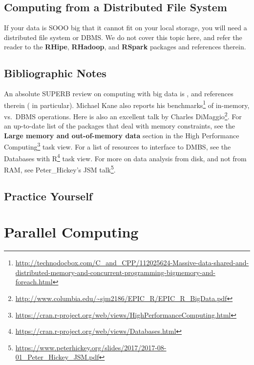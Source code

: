 \documentclass[]{book}
\renewcommand{\href}[2]{#2\footnote{\url{#1}}}
\theoremstyle{definition}
\theoremstyle{definition}
\theoremstyle{definition}
\theoremstyle{remark}
\begin{document}
\hypertarget{computing-from-a-distributed-file-system}{%
\section{Computing from a Distributed File System}\label{computing-from-a-distributed-file-system}}

If your data is SOOO big that it cannot fit on your local storage, you will need a distributed file system or DBMS.
We do not cover this topic here, and refer the reader to the \textbf{RHipe}, \textbf{RHadoop}, and \textbf{RSpark} packages and references therein.

\hypertarget{bibliographic-notes-13}{%
\section{Bibliographic Notes}\label{bibliographic-notes-13}}

An absolute SUPERB review on computing with big data is \citet{wang2015statistical}, and references therein (\citet{kane2013scalable} in particular).
Michael Kane also reports \href{http://technodocbox.com/C_and_CPP/112025624-Massive-data-shared-and-distributed-memory-and-concurrent-programming-bigmemory-and-foreach.html}{his benchmarks} of in-memory, vs.~DBMS operations.
Here is also an excellent talk by \href{http://www.columbia.edu/~sjm2186/EPIC_R/EPIC_R_BigData.pdf}{Charles DiMaggio}.
For an up-to-date list of the packages that deal with memory constraints, see the \textbf{Large memory and out-of-memory data} section in the \href{https://cran.r-project.org/web/views/HighPerformanceComputing.html}{High Performance Computing} task view.
For a list of resources to interface to DMBS, see the \href{https://cran.r-project.org/web/views/Databases.html}{Databases with R} task view.
For more on data analysis from disk, and not from RAM, see \href{https://www.peterhickey.org/slides/2017/2017-08-01_Peter_Hickey_JSM.pdf}{Peter\_Hickey's JSM talk}.

\hypertarget{practice-yourself-11}{%
\section{Practice Yourself}\label{practice-yourself-11}}

\hypertarget{parallel}{%
\chapter{Parallel Computing}\label{parallel}}
\end{document}
